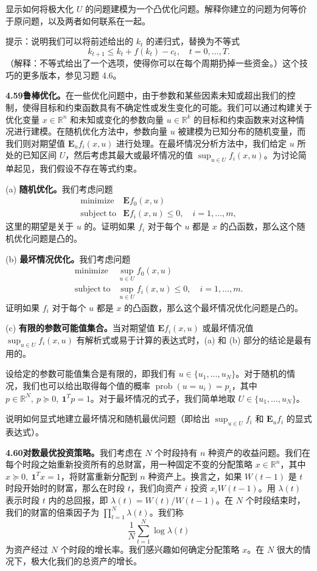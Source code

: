 \documentclass[UTF8, 12pt, fontset=fandol, oneside]{ctexart}
\begin{document}
显示如何将极大化 $U$ 的问题建模为一个凸优化问题。解释你建立的问题为何等价于原问题，以及两者如何联系在一起。

提示：说明我们可以将前述给出的 $k_t$ 的递归式，替换为不等式
\[
k_{t+1}\leq k_t+f(k_t)-c_t,\quad t=0,\ldots,T.
\]
（解释：不等式给出了一个选项，使得你可以在每个周期扔掉一些资金。）这个技巧的更多版本，参见习题 4.6。

\noindent\textbf{4.59\quad 鲁棒优化。}\quad 在一些优化问题中，由于参数和某些因素未知或超出我们的控制，使得目标和约束函数具有不确定性或发生变化的可能。我们可以通过构建关于优化变量 $x\in\mathbb{R}^n$ 和未知或变化的参数向量 $u\in\mathbb{R}^k$ 的目标和约束函数来对这种情况进行建模。在随机优化方法中，参数向量 $u$ 被建模为已知分布的随机变量，而我们则对期望值 $\mathbf{E}_u f_i(x,u)$ 进行处理。在最坏情况分析方法中，我们给定 $u$ 所处的已知区间 $U$，然后考虑其最大或最坏情况的值 $\sup_{u\in U} f_i(x,u)$。为讨论简单起见，我们假设不存在等式约束。

(a) \textbf{随机优化。}\quad 我们考虑问题
\[
\begin{array}{ll}
\mathop{\mathrm{minimize}} & \mathbf{E}f_0(x,u)\\
\mathrm{subject\ to} & \mathbf{E}f_i(x,u)\leq0,\quad i=1,\ldots,m,
\end{array}
\]
这里的期望是关于 $u$ 的。证明如果 $f_i$ 对于每个 $u$ 都是 $x$ 的凸函数，那么这个随机优化问题是凸的。

(b) \textbf{最坏情况优化。}\quad 我们考虑问题
\[
\begin{array}{ll}
\mathop{\mathrm{minimize}} & \sup_{u\in U} f_0(x,u)\\
\mathrm{subject\ to} & \sup_{u\in U} f_i(x,u)\leq0,\quad i=1,\ldots,m.
\end{array}
\]
证明如果 $f_i$ 对于每个 $u$ 都是 $x$ 的凸函数，那么这个最坏情况优化问题是凸的。

(c) \textbf{有限的参数可能值集合。}\quad 当对期望值 $\mathbf{E}f_i(x,u)$ 或最坏情况值 $\sup_{u\in U}f_i(x,u)$ 有解析式或易于计算的表达式时，(a) 和 (b) 部分的结论是最有用的。

设给定的参数可能值集合是有限的，即我们有 $u\in\{u_1,\ldots,u_N\}$。对于随机的情况，我们也可以给出取得每个值的概率 $\operatorname{prob}(u=u_i)=p_i$，其中 $p\in\mathbb{R}^N,\ p\succeq0,\ \mathbf{1}^Tp=1$。对于最坏情况的式子，我们简单地取 $U\in\{u_1,\ldots,u_N\}$。

说明如何显式地建立最坏情况和随机最优问题（即给出 $\sup_{u\in U}f_i$ 和 $\mathbf{E}_u f_i$ 的显式表达式）。

\noindent\textbf{4.60\quad 对数最优投资策略。}\quad 我们考虑在 $N$ 个时段持有 $n$ 种资产的收益问题。我们在每个时段之始重新投资所有的总财富，用一种固定不变的分配策略 $x\in\mathbb{R}^n$，其中 $x\succeq0,\ \mathbf{1}^Tx=1$，将财富重新分配到 $n$ 种资产上。换言之，如果 $W(t-1)$ 是 $t$ 时段开始时的财富，那么在时段 $t$，我们向资产 $i$ 投资 $x_iW(t-1)$。用 $\lambda(t)$ 表示时段 $t$ 内的总回报，即 $\lambda(t)=W(t)/W(t-1)$。在 $N$ 个时段结束时，我们的财富的倍乘因子为 $\prod_{t=1}^N\lambda(t)$。我们称
\[
\frac{1}{N}\sum_{t=1}^N\log\lambda(t)
\]
为资产经过 $N$ 个时段的增长率。我们感兴趣如何确定分配策略 $x$。在 $N$ 很大的情况下，极大化我们的总资产的增长。
\end{document}
